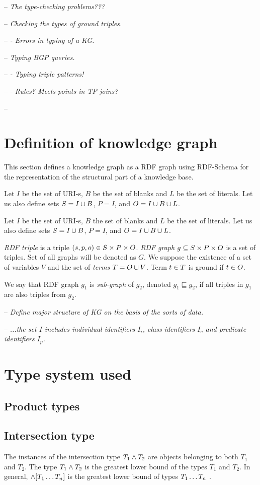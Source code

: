 \documentclass[runningheads]{llncs}
\newcommand{\notes}[1]{\noindent\begin{small}-- \emph{#1}\\\end{small}}
\begin{document}
\notes{The type-checking problems???}
\notes{Checking the types of ground triples.}
\notes{- Errors in typing of a KG.}
\notes{Typing BGP queries.}
\notes{- Typing triple patterns!}
\notes{- Rules? Meets points in TP joins?}
\notes{}


\section{Definition of knowledge graph}

This section defines a knowledge graph as a RDF graph \cite{rdf} using
RDF-Schema \cite{rdfschema} for the representation of the structural
part of a knowledge base.

Let $I$ be the set of URI-s, $B$ be the set of blanks and $L$ be the
set of literals. Let us also define sets $S = I\cup\/B$, $P = I$, and
$O = I\cup\/B\cup\/L$.

Let $I$ be the set of URI-s, $B$ the set of blanks and $L$ be the set
of literals. Let us also define sets $S = I\cup\/B$, $P = I$, and
$O = I\cup\/B\cup\/L$.

\emph{RDF triple} is a triple $(s,p,o)\in\/S\times\/P\times\/O$.
\emph{RDF graph} $g\subseteq\/S\times\/P\times\/O$ is a set of
triples. Set of all graphs will be denoted as $G$. We suppose the
existence of a set of variables $V$ and the set of \emph{terms}
$T = O\cup\/V$. Term $t\in\/T$ is ground if $t\in\/O$.

We say that RDF graph $g_1$ is \emph{sub-graph} of $g_2$, denoted
$g_1 \sqsubseteq g_2$, if all triples in $g_1$ are also triples from
$g_2$. 

\notes{Define major structure of KG on the basis of the sorts of data.}
\notes{...the set $I$ includes individual identifiers $I_i$, class identifiers $I_c$ and predicate identifiers $I_p$.}

\section{Type system used}

\subsection{Product types}

\subsection{Intersection type}

The instances of the intersection type $T_1\land\/T_2$ are objects
belonging to both $T_1$ and $T_2$. The type $T_1\land\/T_2$ is the
greatest lower bound of the types $T_1$ and $T_2$. In general,
$\land[T_1\ldots\/T_n]$ is the greatest lower bound of types
$T_1\ldots\/T_n$ \cite{Pierce91IntersectUnion,Pierce96IntersectionTypes}.
\end{document}
